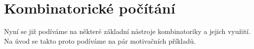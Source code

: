 \chapter{Kombinatorické počítání}

Nyní se již podíváme na některé základní nástroje kombinatoriky a jejich využití. Na úvod se takto proto podíváme na pár motivačních příkladů.


